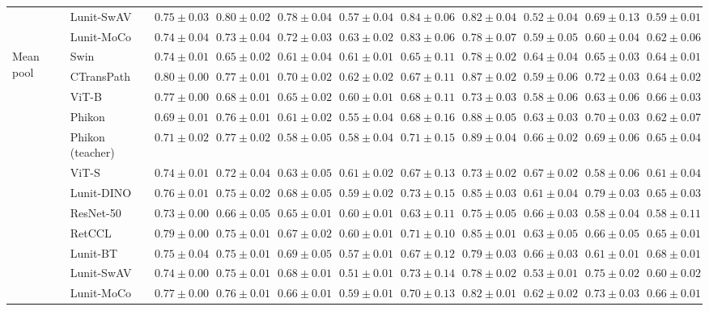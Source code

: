 \begin{tabular}{ll|cccc|c|cccc}
 & Lunit-SwAV & $0.75 \pm 0.03$ & $\mathbf{0.80 \pm 0.02}$ & $0.78 \pm 0.04$ & $0.57 \pm 0.04$ & $0.84 \pm 0.06$ & $0.82 \pm 0.04$ & $0.52 \pm 0.04$ & $0.69 \pm 0.13$ & $0.59 \pm 0.01$ \\
 & Lunit-MoCo & $0.74 \pm 0.04$ & $0.73 \pm 0.04$ & $0.72 \pm 0.03$ & $\mathbf{0.63 \pm 0.02}$ & $0.83 \pm 0.06$ & $0.78 \pm 0.07$ & $0.59 \pm 0.05$ & $0.60 \pm 0.04$ & $0.62 \pm 0.06$ \\
\cline{1-11}
\multirow[t]{12}{*}{Mean pool} & Swin & $0.74 \pm 0.01$ & $0.65 \pm 0.02$ & $0.61 \pm 0.04$ & $0.61 \pm 0.01$ & $0.65 \pm 0.11$ & $0.78 \pm 0.02$ & $0.64 \pm 0.04$ & $0.65 \pm 0.03$ & $0.64 \pm 0.01$ \\
 & CTransPath & $\mathbf{0.80 \pm 0.00}$ & $0.77 \pm 0.01$ & $\mathbf{0.70 \pm 0.02}$ & $\mathbf{0.62 \pm 0.02}$ & $0.67 \pm 0.11$ & $0.87 \pm 0.02$ & $0.59 \pm 0.06$ & $0.72 \pm 0.03$ & $0.64 \pm 0.02$ \\
 & ViT-B & $0.77 \pm 0.00$ & $0.68 \pm 0.01$ & $0.65 \pm 0.02$ & $0.60 \pm 0.01$ & $0.68 \pm 0.11$ & $0.73 \pm 0.03$ & $0.58 \pm 0.06$ & $0.63 \pm 0.06$ & $0.66 \pm 0.03$ \\
 & Phikon & $0.69 \pm 0.01$ & $0.76 \pm 0.01$ & $0.61 \pm 0.02$ & $0.55 \pm 0.04$ & $0.68 \pm 0.16$ & $0.88 \pm 0.05$ & $0.63 \pm 0.03$ & $0.70 \pm 0.03$ & $0.62 \pm 0.07$ \\
 & Phikon (teacher) & $0.71 \pm 0.02$ & $\mathbf{0.77 \pm 0.02}$ & $0.58 \pm 0.05$ & $0.58 \pm 0.04$ & $0.71 \pm 0.15$ & $\mathbf{0.89 \pm 0.04}$ & $0.66 \pm 0.02$ & $0.69 \pm 0.06$ & $0.65 \pm 0.04$ \\
 & ViT-S & $0.74 \pm 0.01$ & $0.72 \pm 0.04$ & $0.63 \pm 0.05$ & $0.61 \pm 0.02$ & $0.67 \pm 0.13$ & $0.73 \pm 0.02$ & $\mathbf{0.67 \pm 0.02}$ & $0.58 \pm 0.06$ & $0.61 \pm 0.04$ \\
 & Lunit-DINO & $0.76 \pm 0.01$ & $0.75 \pm 0.02$ & $0.68 \pm 0.05$ & $0.59 \pm 0.02$ & $\mathbf{0.73 \pm 0.15}$ & $0.85 \pm 0.03$ & $0.61 \pm 0.04$ & $\mathbf{0.79 \pm 0.03}$ & $0.65 \pm 0.03$ \\
 & ResNet-50 & $0.73 \pm 0.00$ & $0.66 \pm 0.05$ & $0.65 \pm 0.01$ & $0.60 \pm 0.01$ & $0.63 \pm 0.11$ & $0.75 \pm 0.05$ & $0.66 \pm 0.03$ & $0.58 \pm 0.04$ & $0.58 \pm 0.11$ \\
 & RetCCL & $0.79 \pm 0.00$ & $0.75 \pm 0.01$ & $0.67 \pm 0.02$ & $0.60 \pm 0.01$ & $0.71 \pm 0.10$ & $0.85 \pm 0.01$ & $0.63 \pm 0.05$ & $0.66 \pm 0.05$ & $0.65 \pm 0.01$ \\
 & Lunit-BT & $0.75 \pm 0.04$ & $0.75 \pm 0.01$ & $0.69 \pm 0.05$ & $0.57 \pm 0.01$ & $0.67 \pm 0.12$ & $0.79 \pm 0.03$ & $0.66 \pm 0.03$ & $0.61 \pm 0.01$ & $\mathbf{0.68 \pm 0.01}$ \\
 & Lunit-SwAV & $0.74 \pm 0.00$ & $0.75 \pm 0.01$ & $0.68 \pm 0.01$ & $0.51 \pm 0.01$ & $0.73 \pm 0.14$ & $0.78 \pm 0.02$ & $0.53 \pm 0.01$ & $0.75 \pm 0.02$ & $0.60 \pm 0.02$ \\
 & Lunit-MoCo & $0.77 \pm 0.00$ & $0.76 \pm 0.01$ & $0.66 \pm 0.01$ & $0.59 \pm 0.01$ & $0.70 \pm 0.13$ & $0.82 \pm 0.01$ & $0.62 \pm 0.02$ & $0.73 \pm 0.03$ & $0.66 \pm 0.01$ \\
\cline{1-11}
\bottomrule
\end{tabular}

